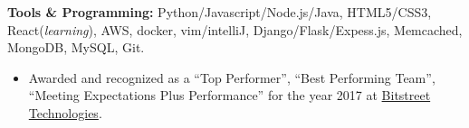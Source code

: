 \documentclass[11pt,a4paper]{article}
\newcommand{\quotes}[1]{``#1''}
\begin{document}
\spacedhrule{0.5em}{-0.4em}


\inlineheadedsection
{\textbf{Tools \& Programming:}}
{Python/\nsp Javascript/\nsp Node.js/\nsp Java}, HTML5/CSS3, React(\textit{learning}), AWS, docker, vim/\nsp intelliJ, Django/Flask/Expess.js, Memcached, MongoDB, MySQL, Git.

%  

\spacedhrule{1.6em}{-0.4em}

{%
    \begin{itemize}
    \item Awarded and recognized as a \quotes{Top Performer}, \quotes{Best Performing Team}, \quotes{Meeting Expectations Plus Performance} for the year 2017 at {\href{http://bitstreet.in/}{Bitstreet Technologies}}.
    \end{itemize}
}
\end{document}
